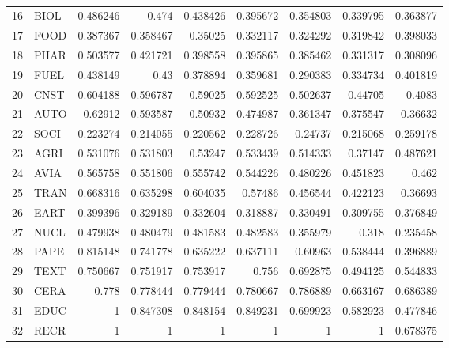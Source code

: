 \documentclass[12pt,letterpaper]{article}
\begin{document}
\begin{table}[H]
{\begin{tabular}{rlrrrrrrr}
16 & BIOL & 0.486246 & 0.474    & 0.438426 & 0.395672 & 0.354803 & 0.339795 & 0.363877 \\
17 & FOOD & 0.387367 & 0.358467 & 0.35025  & 0.332117 & 0.324292 & 0.319842 & 0.398033 \\
18 & PHAR & 0.503577 & 0.421721 & 0.398558 & 0.395865 & 0.385462 & 0.331317 & 0.308096 \\
19 & FUEL & 0.438149 & 0.43     & 0.378894 & 0.359681 & 0.290383 & 0.334734 & 0.401819 \\
20 & CNST & 0.604188 & 0.596787 & 0.59025  & 0.592525 & 0.502637 & 0.44705  & 0.4083   \\
21 & AUTO & 0.62912  & 0.593587 & 0.50932  & 0.474987 & 0.361347 & 0.375547 & 0.36632  \\
22 & SOCI & 0.223274 & 0.214055 & 0.220562 & 0.228726 & 0.24737  & 0.215068 & 0.259178 \\
23 & AGRI & 0.531076 & 0.531803 & 0.53247  & 0.533439 & 0.514333 & 0.37147  & 0.487621 \\
24 & AVIA & 0.565758 & 0.551806 & 0.555742 & 0.544226 & 0.480226 & 0.451823 & 0.462    \\
25 & TRAN & 0.668316 & 0.635298 & 0.604035 & 0.57486  & 0.456544 & 0.422123 & 0.36693  \\
26 & EART & 0.399396 & 0.329189 & 0.332604 & 0.318887 & 0.330491 & 0.309755 & 0.376849 \\
27 & NUCL & 0.479938 & 0.480479 & 0.481583 & 0.482583 & 0.355979 & 0.318    & 0.235458 \\
28 & PAPE & 0.815148 & 0.741778 & 0.635222 & 0.637111 & 0.60963  & 0.538444 & 0.396889 \\
29 & TEXT & 0.750667 & 0.751917 & 0.753917 & 0.756    & 0.692875 & 0.494125 & 0.544833 \\
30 & CERA & 0.778    & 0.778444 & 0.779444 & 0.780667 & 0.786889 & 0.663167 & 0.686389 \\
31 & EDUC & 1        & 0.847308 & 0.848154 & 0.849231 & 0.699923 & 0.582923 & 0.477846 \\
32 & RECR & 1        & 1        & 1        & 1        & 1        & 1        & 0.678375 \\ \hline
\end{tabular}
}
\caption{}
\label{tab:7}
\end{table}
\end{document}
